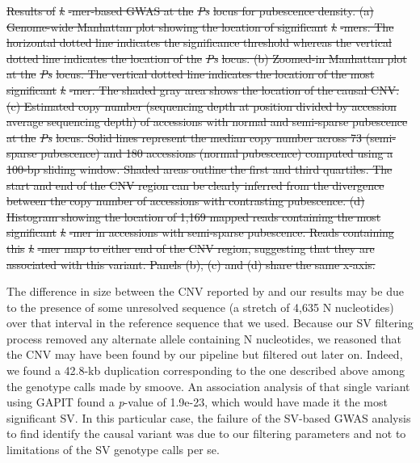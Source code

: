 \documentclass{article}
\providecommand{\DIFdeltex}[1]{{\protect\color{red}\sout{#1}}}                      %
\providecommand{\DIFdelbegin}{} %
\providecommand{\DIFdelend}{} %
\providecommand{\DIFdelFL}[1]{\DIFdel{#1}} %
\providecommand{\DIFdel}[1]{\texorpdfstring{\DIFdeltex{#1}}{}} %
\newcommand{\DIFscaledelfig}{0.5}
\newlength{\DIFdelgraphicswidth} %
\newlength{\DIFdelgraphicsheight} %
\newcommand{\DIFdelincludegraphics}[2][]{%
\sbox{\DIFdelgraphicsbox}{\DIFOincludegraphics[#1]{#2}}%
\settoboxwidth{\DIFdelgraphicswidth}{\DIFdelgraphicsbox} %
\settoboxtotalheight{\DIFdelgraphicsheight}{\DIFdelgraphicsbox} %
\scalebox{\DIFscaledelfig}{%
\parbox[b]{\DIFdelgraphicswidth}{\usebox{\DIFdelgraphicsbox}\\[-\baselineskip] \rule{\DIFdelgraphicswidth}{0em}}\llap{\resizebox{\DIFdelgraphicswidth}{\DIFdelgraphicsheight}{%
\setlength{\unitlength}{\DIFdelgraphicswidth}%
\begin{picture}(1,1)%
\thicklines\linethickness{2pt} %
{\color[rgb]{1,0,0}\put(0,0){\framebox(1,1){}}}%
{\color[rgb]{1,0,0}\put(0,0){\line( 1,1){1}}}%
{\color[rgb]{1,0,0}\put(0,1){\line(1,-1){1}}}%
\end{picture}%
}\hspace*{3pt}}} %
} %
\DeclareRobustCommand{\DIFdelbegin}{\DIFOdelbegin \let\includegraphics\DIFdelincludegraphics} %
\DeclareRobustCommand{\DIFdelend}{\DIFOaddend \let\includegraphics\DIFOincludegraphics} %
\begin{document}
\DIFdelbegin %
{%
\DIFdelFL{Results of }\textit{\DIFdelFL{k}}%
\DIFdelFL{-mer-based GWAS at the
	}\textit{\DIFdelFL{Ps}} %
\DIFdelFL{locus for pubescence density.
	(a) Genome-wide Manhattan plot showing the location of significant }\textit{\DIFdelFL{k}}%
\DIFdelFL{-mers. The
	horizontal dotted line indicates the significance threshold whereas the
	vertical dotted line indicates the location of the }\textit{\DIFdelFL{Ps}} %
\DIFdelFL{locus.
	(b) Zoomed-in Manhattan plot at the }\textit{\DIFdelFL{Ps}} %
\DIFdelFL{locus. The
	vertical dotted line indicates the location of the most significant
	}\textit{\DIFdelFL{k}}%
\DIFdelFL{-mer. The shaded gray area shows the location of the causal CNV.
	(c) Estimated copy number (sequencing depth at position divided by
	accession average sequencing depth) of accessions with normal and
	semi-sparse pubescence at the }\textit{\DIFdelFL{Ps}} %
\DIFdelFL{locus. Solid lines represent
	the median copy number across 73 (semi-sparse pubescence) and 180
	accessions (normal pubescence) computed using a 100-bp sliding window.
	Shaded areas outline the first and third quartiles. The start and end
	of the CNV region can be clearly inferred from the divergence between
	the copy number of accessions with contrasting pubescence.
	(d) Histogram showing the location of 1,169 mapped reads containing the
	most significant }\textit{\DIFdelFL{k}}%
\DIFdelFL{-mer in accessions with semi-sparse pubescence.
	Reads containing this }\textit{\DIFdelFL{k}}%
\DIFdelFL{-mer map to either end of the CNV
	region, suggesting that they are associated with this variant. Panels
	(b), (c) and (d) share the same x-axis.}}

\DIFdelend The difference in size between the CNV reported by  and our
results may be due to the presence of some unresolved sequence (a stretch of
4,635 N nucleotides) over that interval in the reference sequence that we used.
Because our SV filtering process removed any alternate allele containing N nucleotides,
we reasoned that the CNV may have been found by our pipeline but
filtered out later on. Indeed, we found a 42.8-kb duplication corresponding
to the one described above among the genotype calls made by smoove. An association
analysis of that single variant using GAPIT found a \textit{p}-value of 1.9e-23,
which would have made it the most significant SV. In this particular case, the
failure of the SV-based GWAS analysis to find identify the causal variant was due
to our filtering parameters and not to limitations of the SV genotype calls per se.
\end{document}

